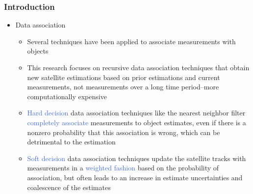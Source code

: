 \documentclass[hyperref={pdftex,pdfpagemode=none,pdfstartview=FitH},10pt]{beamer}
\def\Emph{\textcolor{RoyalBlue}}
\begin{document}
\begin{frame}
\frametitle{Introduction}


\begin{itemize}
\item Data association
	\begin{itemize}
	\item Several techniques have been applied to associate measurements with objects
	\item This research focuses on recursive data association techniques that obtain new satellite estimations based on prior estimations and current measurements, not measurements over a long time period--more computationally expensive
	\item \Emph{Hard decision} data association techniques like the nearest neighbor filter \Emph{completely associate} measurements to object estimates, even if there is a nonzero probability that this association is wrong, which can be detrimental to the estimation
	\item \Emph{Soft decision} data association techniques update the satellite tracks with measurements in a \Emph{weighted fashion} based on the probability of association, but often leads to an increase in estimate uncertainties and coalescence of the estimates
	\end{itemize}
\end{itemize}

\end{frame}
\end{document}
